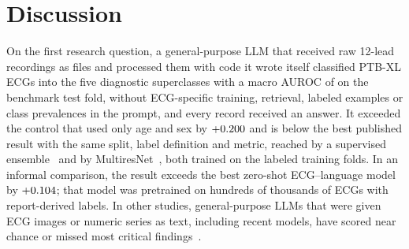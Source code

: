 \section{Discussion}

On the first research question, a general-purpose LLM that received raw 12-lead recordings as files and processed them with code it wrote itself
classified PTB-XL ECGs into the five diagnostic superclasses with a macro AUROC of \MainAUROC{} on the benchmark test
fold, without ECG-specific training, retrieval, labeled examples or class prevalences in the prompt, and every record
received an answer. It exceeded the control that used only age and sex by $+0.200$ and is
\GapToBestPublishedAbs{} below the best published result with the same split, label
definition and metric, reached by a supervised ensemble~\citep{Strodthoff2021} and by MultiresNet~\citep{shi2023multires},
both trained on the labeled training folds. In an
informal comparison, the result exceeds the best zero-shot ECG--language model~\citep{cai2025supreme} by
$+0.104$; that model was pretrained on hundreds of thousands of ECGs with report-derived labels. In other
studies, general-purpose LLMs that were given ECG images or numeric series as text, including recent models, have scored near
chance or missed most critical findings~\citep{liu2024teach,seki2025assessing,ahammad2026ecgimage,soubh2026performance,gao2026luminaecg,liu2025picture,langer2025opentslm}.

